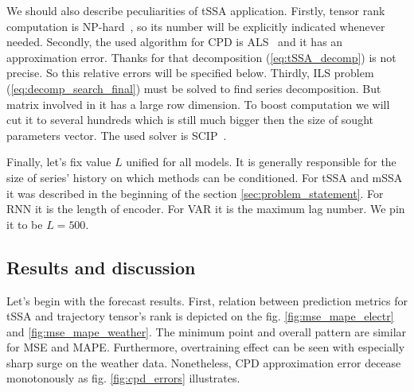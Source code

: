 \documentclass[referee, pdflatex]{sn-jnl}
\theoremstyle{definition}
\theoremstyle{plain}
\begin{document}
	We should also describe peculiarities of tSSA application. Firstly, tensor rank computation is NP-hard~\cite{HASTAD1990644}, so its number will be explicitly indicated whenever needed. Secondly, the used algorithm for CPD is ALS~\cite{kolda_tensors} and it has an approximation error. Thanks for that decomposition (\ref{eq:tSSA_decomp}) is not precise. So this relative errors will be specified below. Thirdly, ILS problem (\ref{eq:decomp_search_final}) must be solved to find series decomposition. But matrix involved in it has a large row dimension. To boost computation we will cut it to several hundreds which is still much bigger then the size of sought parameters vector. The used solver is SCIP~\cite{BolusaniEtal2024ZR}.

	Finally, let's fix value $ L $ unified for all models. It is generally responsible for the size of series' history on which methods can be conditioned. For tSSA and mSSA it was described in the beginning of the section \ref{sec:problem_statement}. For RNN it is the length of encoder. For VAR it is the maximum lag number. We pin it to be $ L = 500 $.
	
	\subsection{Results and discussion}
	
	Let's begin with the forecast results. First, relation between prediction metrics for tSSA and trajectory tensor's rank is depicted on the fig. \ref{fig:mse_mape_electr} and \ref{fig:mse_mape_weather}. The minimum point and overall pattern are similar for MSE and MAPE. Furthermore, overtraining effect can be seen with especially sharp surge on the weather data. Nonetheless, CPD approximation error decease monotonously as fig. \ref{fig:cpd_errors} illustrates.
	
\end{document}
